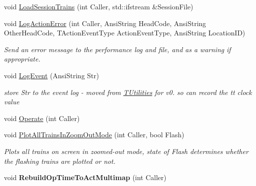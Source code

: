 \begin{DoxyCompactItemize}
void \mbox{\hyperlink{class_t_train_controller_a853ddf9799c9fd7063c81ffa1dc754d7}{Load\+Session\+Trains}} (int Caller, std\+::ifstream \&Session\+File)
\item 
\mbox{\label{class_t_train_controller_a9acd46962be476bc76c8d5ce59fff399}} 
void \mbox{\hyperlink{class_t_train_controller_a9acd46962be476bc76c8d5ce59fff399}{Log\+Action\+Error}} (int Caller, Ansi\+String Head\+Code, Ansi\+String Other\+Head\+Code, T\+Action\+Event\+Type Action\+Event\+Type, Ansi\+String Location\+ID)
\begin{DoxyCompactList}\small\item\em Send an error message to the performance log and file, and as a warning if appropriate. \end{DoxyCompactList}\item 
\mbox{\label{class_t_train_controller_ac88477499edd24550fae9b90b5561ed1}} 
void \mbox{\hyperlink{class_t_train_controller_ac88477499edd24550fae9b90b5561ed1}{Log\+Event}} (Ansi\+String Str)
\begin{DoxyCompactList}\small\item\em store Str to the event log -\/ moved from \mbox{\hyperlink{class_t_utilities}{T\+Utilities}} for v0. so can record the tt clock value \end{DoxyCompactList}\item 
void \mbox{\hyperlink{class_t_train_controller_a20a1576dea1d86ed78fc5e9f46343481}{Operate}} (int Caller)
\item 
\mbox{\label{class_t_train_controller_a2f9cd71b60b45de8380f5fad7bbd5dd8}} 
void \mbox{\hyperlink{class_t_train_controller_a2f9cd71b60b45de8380f5fad7bbd5dd8}{Plot\+All\+Trains\+In\+Zoom\+Out\+Mode}} (int Caller, bool Flash)
\begin{DoxyCompactList}\small\item\em Plots all trains on screen in zoomed-\/out mode, state of \textquotesingle{}Flash\textquotesingle{} determines whether the flashing trains are plotted or not. \end{DoxyCompactList}\item 
\mbox{\label{class_t_train_controller_a0e16b9cb91bb29f83bffc7ae3461200d}} 
void {\bfseries Rebuild\+Op\+Time\+To\+Act\+Multimap} (int Caller)
\item 

\end{DoxyCompactItemize}
